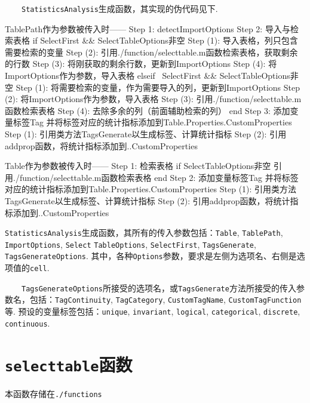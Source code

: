 \documentclass[a4paper, titlepage]{article}
\begin{document}
    　　\texttt{StatisticsAnalysis}生成函数，其实现的伪代码见下.
\begin{matlabcode}
TablePath作为参数被传入时——
Step 1: detectImportOptions
Step 2: 导入与检索表格
    if SelectFirst && SelectTableOptions非空
        Step (1): 导入表格，列只包含需要检索的变量
        Step (2): 引用./function/selecttable.m函数检索表格，获取剩余的行数
        Step (3): 将刚获取的剩余行数，更新到ImportOptions
        Step (4): 将ImportOptions作为参数，导入表格
    elseif ~SelectFirst && SelectTableOptions非空
        Step (1): 将需要检索的变量，作为需要导入的列，更新到ImportOptions
        Step (2): 将ImportOptions作为参数，导入表格
        Step (3): 引用./function/selecttable.m函数检索表格
        Step (4): 去除多余的列（前面辅助检索的列）
    end
Step 3: 添加变量标签Tag
        并将标签对应的统计指标添加到Table.Properties.CustomProperties
    Step (1): 引用类方法TagsGenerate以生成标签、计算统计指标
    Step (2): 引用addprop函数，将统计指标添加到..CustomProperties
\end{matlabcode}
\begin{matlabcode}
Table作为参数被传入时——
Step 1: 检索表格
    if SelectTableOptions非空
        引用./function/selecttable.m函数检索表格
    end
Step 2: 添加变量标签Tag
        并将标签对应的统计指标添加到Table.Properties.CustomProperties
    Step (1): 引用类方法TagsGenerate以生成标签、计算统计指标
    Step (2): 引用addprop函数，将统计指标添加到..CustomProperties
\end{matlabcode}
    \texttt{StatisticsAnalysis}生成函数，其所有的传入参数包括：\texttt{Table}, \texttt{TablePath}, \texttt{ImportOptions}, \texttt{Select} \texttt{TableOptions}, \texttt{SelectFirst}, \texttt{TagsGenerate}, \texttt{TagsGenerateOptions}. 其中，各种\texttt{Options}参数，要求是左侧为选项名、右侧是选项值的\texttt{cell}.

    　　\texttt{TagsGenerateOptions}所接受的选项名，或\texttt{TagsGenerate}方法所接受的传入参数名，包括：\texttt{TagContinuity}, \texttt{TagCategory}, \texttt{CustomTagName}, \texttt{CustomTagFunction}\!等. 预设的变量标签包括：\texttt{unique}, \texttt{invariant}, \texttt{logical}, \texttt{categorical}, \texttt{discrete}, \texttt{continuous}.

    \section{\texttt{selecttable}函数}\label{app:selecttable}
    本函数存储在\texttt{./functions}
\end{document}
